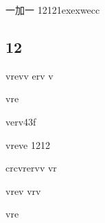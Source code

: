 \documentclass{article}
\begin{document}
\begin{CJK}{UTF8}{gbsn}
\title{}
\author{LHY}
\date{\today}
\maketitle
\tableofcontents

\newpage
一加一
12121exexwecc


\subsection{12}
vrevv
erv
v

vre

verv43f




vreve
1212


crcvrervv
vr

vrev
vrv

vre


































\end{CJK}		
\end{document}
